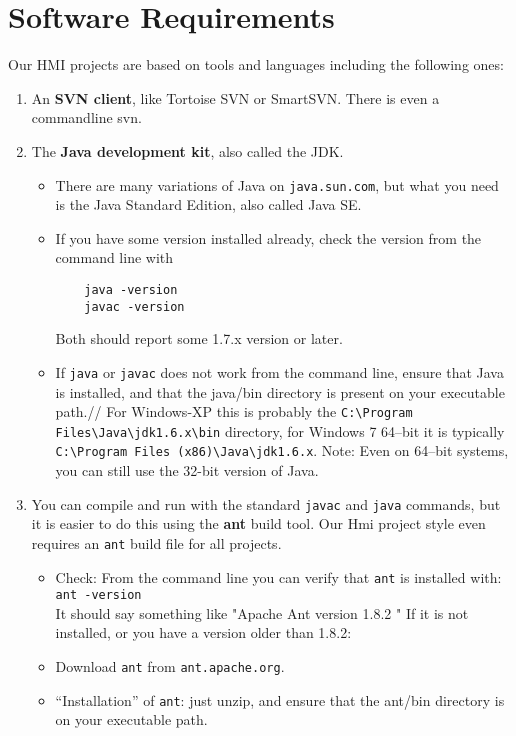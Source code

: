
\chapter{Software Requirements}\label{chapter:softwarerequirements}

Our HMI projects are based on tools and languages including the following ones:

\begin{enumerate}
\item An \textbf{SVN client}, like Tortoise SVN or SmartSVN. There is even a commandline svn.
\item The \textbf{Java development kit}, also called the JDK.
\begin{itemize}
\item There are many variations of Java on \verb#java.sun.com#, but what
you need is the Java Standard Edition, also called Java SE.
\item If you have some version installed already, check the version from the command line with
\begin{verbatim}
    java -version
    javac -version
\end{verbatim}
Both should report some 1.7.x version or later.
\item If \verb#java# or \verb#javac# does not work from the command line,
ensure that Java is installed, and that the java/bin directory is present on your executable path.//
For Windows-XP this is probably the \verb"C:\Program Files\Java\jdk1.6.x\bin" directory,
for Windows 7 64--bit it is typically \verb"C:\Program Files (x86)\Java\jdk1.6.x".
Note: Even on 64--bit systems, you can still use the 32-bit version of Java.
\end{itemize}
\item    You can compile and run with the standard \verb#javac# and \verb#java# commands,
    but it is easier to do this using the \textbf{ant} build tool.
    Our Hmi project style even requires an \verb"ant" build file for all projects.
    \begin{itemize}
    \item Check: From the command line you can verify that \verb#ant# is installed with:\\[1ex]
    \verb#ant -version# \\[1ex]
    It should say something like "Apache Ant version 1.8.2 "
    If it is not installed, or you have a version older than 1.8.2:
    \item Download \verb#ant# from \verb#ant.apache.org#.
    \item ``Installation'' of \verb#ant#: just unzip, and ensure that the ant/bin directory is on your executable path.

\end{itemize}
\end{enumerate}
